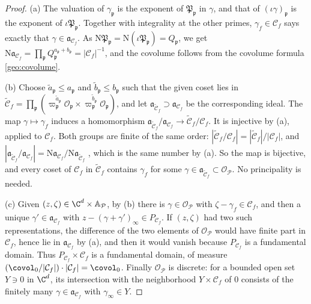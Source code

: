 \begin{proof}
(a) The valuation of $\gamma_{\mathfrak p}$ is the exponent of
$\mathfrak P_{\mathfrak p}$ in $\gamma$, and that of $(\iota\gamma)_{\mathfrak
p}$ is the exponent of $\iota\mathfrak P_{\mathfrak p}$. Together with
integrality at the other primes, $\gamma_f\in\mathcal C_f$ says exactly
that $\gamma\in\mathfrak a_{\mathcal C_f}$. As $\mathrm N\mathfrak P_{\mathfrak
p}=\mathrm N(\iota\mathfrak P_{\mathfrak p})=Q_{\mathfrak p}$, we get
$\mathrm N\mathfrak a_{\mathcal C_f}=\prod_{\mathfrak p}Q_{\mathfrak p}^{a_{\mathfrak
p}+b_{\mathfrak p}}=|\mathcal C_f|^{-1}$, and the covolume follows from
the covolume formula \eqref{geo:covolume}.

(b) Choose $\tilde a_{\mathfrak p}\le a_{\mathfrak p}$ and $\tilde
b_{\mathfrak p}\le b_{\mathfrak p}$ such that the given coset lies in
$\tilde{\mathcal C}_f=\prod_{\mathfrak p}(\varpi_{\mathfrak p}^{\tilde
a_{\mathfrak p}}\mathcal O_{\mathfrak p}\times\varpi_{\mathfrak
p}^{\tilde b_{\mathfrak p}}\mathcal O_{\mathfrak p})$, and let
$\mathfrak a_{\tilde{\mathcal C}_f}\supset\mathfrak a_{\mathcal C_f}$ be the corresponding ideal. The
map $\gamma\mapsto\gamma_f$ induces a homomorphism $\mathfrak a_{\tilde{\mathcal C}_f}/\mathfrak a_{\mathcal C_f}\to\tilde{\mathcal C}_f/\mathcal C_f$. It is injective by
(a), applied to $\mathcal C_f$. Both groups are finite of the same
order: $|\tilde{\mathcal C}_f/\mathcal C_f|=|\tilde{\mathcal
C}_f|/|\mathcal C_f|$, and $|\mathfrak a_{\tilde{\mathcal C}_f}/\mathfrak a_{\mathcal C_f}|=\mathrm N\mathfrak a_{\mathcal C_f}/\mathrm N\mathfrak a_{\tilde{\mathcal C}_f}$ \cite[Proposition~4.2]{MilneANT}, which is the
same number by (a). So the map is bijective, and every coset of
$\mathcal C_f$ in $\tilde{\mathcal C}_f$ contains $\gamma_f$ for some
$\gamma\in\mathfrak a_{\tilde{\mathcal C}_f}\subset\mathcal O_{\mathcal P}$. No principality is needed.

(c) Given $(z,\zeta)\in\C^d\times\mathbb A_{\mathcal P}$, by (b) there is
$\gamma\in\mathcal O_{\mathcal P}$ with $\zeta-\gamma_f\in\mathcal C_f$, and then a unique
$\gamma'\in\mathfrak a_{\mathcal C_f}$ with $z-(\gamma+\gamma')_\infty\in P_{\mathcal C_f}$. If $(z,\zeta)$ had two such representations, the difference of the
two elements of $\mathcal O_{\mathcal P}$ would have finite part in $\mathcal C_f$, hence
lie in $\mathfrak a_{\mathcal C_f}$ by (a), and then it would vanish because
$P_{\mathcal C_f}$ is a fundamental domain. Thus
$P_{\mathcal C_f}\times\mathcal C_f$ is a fundamental domain, of measure
$(\covol_0/|\mathcal C_f|)\cdot|\mathcal C_f|=\covol_0$. Finally $\mathcal O_{\mathcal P}$
is discrete: for a bounded open set $Y\ni0$ in $\C^d$, its intersection
with the neighborhood $Y\times\mathcal C_f$ of $0$ consists of the
finitely many $\gamma\in\mathfrak a_{\mathcal C_f}$ with $\gamma_\infty\in Y$.


\end{proof}
